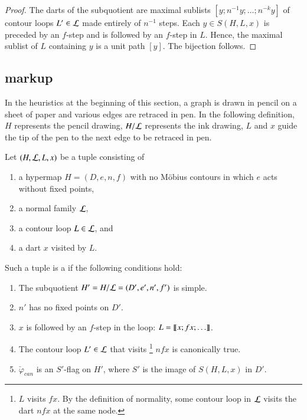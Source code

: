 \begin{proof} The darts of the subquotient are maximal sublists
  $[y;n^{-1} y;\ldots;n^{-k} y]$ of contour loops $L'\in {\cal L}$
  made entirely of $n^{-1}$ steps.  Each $y\in S(H,L,x)$ is preceded
  by an $f$-step and is followed by an $f$-step in $L$.  Hence, the
  maximal sublist of $L$ containing $y$ is a unit path $[y]$.  The
  bijection follows.
\end{proof}


\subsection{markup}\label{sec:face-insert}
%




In the heuristics at the beginning of this section, a graph is drawn in pencil
on a sheet of paper and various edges are retraced in pen.  In the following
definition, $H$ represents the pencil drawing, $H/{\cal L}$ represents the ink
drawing,  $L$ and $x$ guide the tip of the pen to the next edge to be retraced in pen.


\begin{definition}\label{def:marked}
Let $(H,{\cal L},L,x)$ be a tuple consisting of 
\begin{enumerate}
\item a hypermap $H=(D,e,n,f)$ with no M\"obius contours  in which
  $e$ acts without fixed points,  %
\item a normal family ${\cal L}$, 
\item a contour loop $L\in{\cal L}$, and
\item a dart $x$ visited by $L$.
\end{enumerate}
Such a tuple is a  if
the following conditions hold:
\begin{enumerate}
\item The subquotient $H'=H/{\cal L} = (D',e',n',f')$ is simple.  
\item $n'$ has no fixed points on $D'$.
\item $x$ is followed by an $f$-step in the loop: $L = {\llbracket{x;fx;\ldots}\rrbracket}$.
\item The contour loop $L'\in {\cal L}$ that visits%
\footnote{$L$ visits  $f x$.  By the definition of normality, some contour loop in
${\cal L}$ visits the dart $n f x$ at the same node.} 
$n f x$ is canonically true.
\item 
  $\check\varphi_{can}$ is an $S'$-flag on $H'$, where $S'$ is the image of 
  $S(H,L,x)$ in $D'$.  %
\end{enumerate}
\end{definition}


